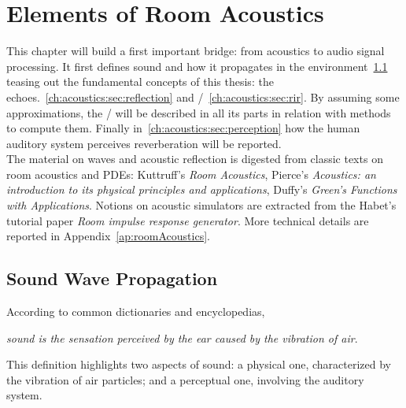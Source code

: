 \chapter{Elements of Room Acoustics}\label{chap:acoustics}
\vspace{-2.5em}
This chapter will build a first important bridge: from acoustics to audio signal processing.
It first defines sound and how it propagates in the environment~\cref{ch:acoustics:sec:wave} teasing out the fundamental concepts of this thesis: the echoes.~\cref{ch:acoustics:sec:reflection} and \RIRdef/~\cref{ch:acoustics:sec:rir}.
By assuming some approximations, the \RIR/ will be described in all its parts in relation with methods to compute them.
Finally in~\cref{ch:acoustics:sec:perception} how the human auditory system perceives reverberation will be reported.
\\The material on waves and acoustic reflection is digested from classic texts on room acoustics and PDEs:
Kuttruff’s \textit{Room Acoustics}, Pierce's \textit{Acoustics: an introduction to its physical principles and applications}, Duffy’s \textit{Green’s Functions with Applications}.
Notions on acoustic simulators are extracted from the Habet's tutorial paper \textit{Room impulse response generator}.
More technical details are reported in Appendix~\ref{ap:roomAcoustics}.

\section{Sound Wave Propagation}\label{ch:acoustics:sec:wave}%
According to common dictionaries and encyclopedias,
\begin{center}
    \textit{sound is the sensation perceived by the ear caused by the vibration of air}.
\end{center}
This definition highlights two aspects of sound: a physical one, characterized by the vibration of air particles; and a perceptual one, involving the auditory system.

